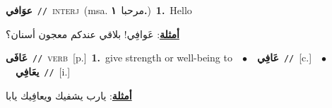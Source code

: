 \documentclass[10pt,a4paper,twoside]{article} %
\begin{document}
\begin{multicols}{2}
{\setlength\topsep{0pt}\textbf{\foreignlanguage{arabic}{عوَافي}}\ {\color{gray}\texttt{//}\color{black}}\ \textsc{interj}\ \color{gray}(msa. \foreignlanguage{arabic}{مرحبا}~\foreignlanguage{arabic}{\textbf{١.}})\color{black}\ \textbf{1.}~Hello\  \begin{flushright}\color{gray}\foreignlanguage{arabic}{\textbf{\underline{\foreignlanguage{arabic}{أمثلة}}}: عَوافِي! بلاقي عندكم معجون أسنان؟}\end{flushright}\color{black}} \vspace{2mm}

{\setlength\topsep{0pt}\textbf{\foreignlanguage{arabic}{عَافَى}}\ {\color{gray}\texttt{//}\color{black}}\ \textsc{verb}\ [p.]\ \textbf{1.}~give strength or well-being to\ \ $\bullet$\ \ \setlength\topsep{0pt}\textbf{\foreignlanguage{arabic}{عَافِي}}\ {\color{gray}\texttt{//}\color{black}}\ [c.]\ \ $\bullet$\ \ \setlength\topsep{0pt}\textbf{\foreignlanguage{arabic}{يعَافِي}}\ {\color{gray}\texttt{//}\color{black}}\ [i.]\  \begin{flushright}\color{gray}\foreignlanguage{arabic}{\textbf{\underline{\foreignlanguage{arabic}{أمثلة}}}: يارب يشفيك ويعافِيك يابا}\end{flushright}\color{black}} \vspace{2mm}


\end{multicols}
\end{document}
